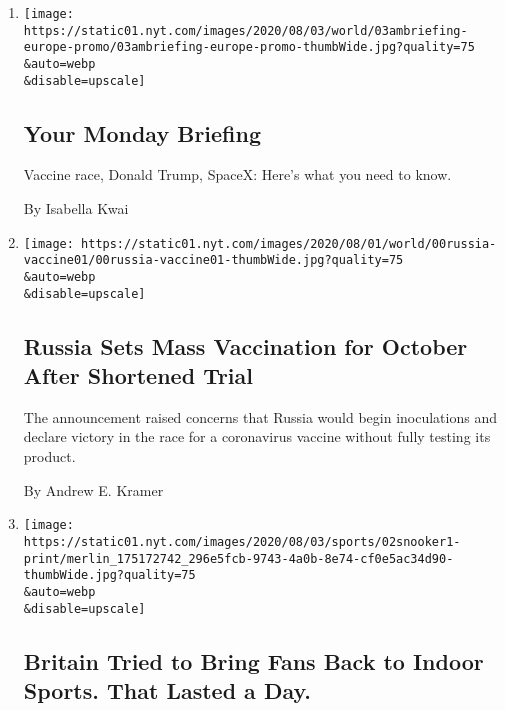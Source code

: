 \begin{enumerate}
\def\labelenumi{\arabic{enumi}.}
\item
  \href{/2020/08/02/briefing/vaccine-race-donald-trump-spacex.html}{}

  \texttt{[image: https://static01.nyt.com/images/2020/08/03/world/03ambriefing-europe-promo/03ambriefing-europe-promo-thumbWide.jpg?quality=75\\\&auto=webp\\\&disable=upscale]}

  \hypertarget{your-monday-briefing}{%
  \subsection{Your Monday Briefing}\label{your-monday-briefing}}

  Vaccine race, Donald Trump, SpaceX: Here's what you need to know.

  By Isabella Kwai
\item
  \href{/2020/08/02/world/europe/russia-trials-vaccine-October.html}{}

  \texttt{[image: https://static01.nyt.com/images/2020/08/01/world/00russia-vaccine01/00russia-vaccine01-thumbWide.jpg?quality=75\\\&auto=webp\\\&disable=upscale]}

  \hypertarget{russia-sets-mass-vaccination-for-october-after-shortened-trial}{%
  \subsection{Russia Sets Mass Vaccination for October After Shortened
  Trial}\label{russia-sets-mass-vaccination-for-october-after-shortened-trial}}

  The announcement raised concerns that Russia would begin inoculations
  and declare victory in the race for a coronavirus vaccine without
  fully testing its product.

  By Andrew E. Kramer
\item
  \href{/2020/08/02/sports/snooker-world-championship.html}{}

  \texttt{[image: https://static01.nyt.com/images/2020/08/03/sports/02snooker1-print/merlin\_175172742\_296e5fcb-9743-4a0b-8e74-cf0e5ac34d90-thumbWide.jpg?quality=75\\\&auto=webp\\\&disable=upscale]}

  \hypertarget{britain-tried-to-bring-fans-back-to-indoor-sports-that-lasted-a-day}{%
  \subsection{Britain Tried to Bring Fans Back to Indoor Sports. That
  Lasted a
  Day.}\label{britain-tried-to-bring-fans-back-to-indoor-sports-that-lasted-a-day}}


\end{enumerate}
